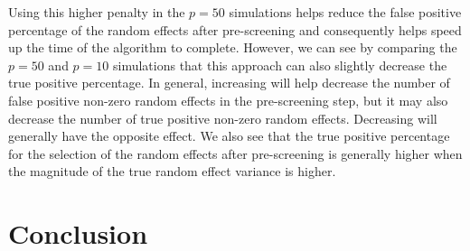 

Using this higher penalty in the \(p=50\) simulations helps
reduce the false positive percentage of the random effects after pre-screening
and consequently helps speed up the time of the algorithm to complete.
However, we can see by comparing the \(p=50\) and \(p=10\) simulations
that this approach can also slightly decrease the true positive percentage. In general, increasing  will help decrease the number of false positive non-zero random effects in the pre-screening step, but it may also decrease the number of true positive non-zero random effects. Decreasing  will generally have the opposite effect. We also see that the true positive percentage for the selection of the random effects after pre-screening is generally higher when the magnitude of the true random effect variance is higher.


\section{Conclusion}
\label{sec:conclusion}

